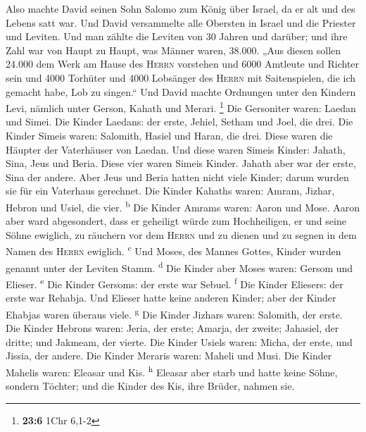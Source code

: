  Also machte David seinen Sohn Salomo zum König über
Israel, da er alt und des Lebens satt war.  Und David
versammelte alle Obersten in Israel und die Priester und Leviten.
 Und man zählte die Leviten von 30 Jahren und darüber; und
ihre Zahl war von Haupt zu Haupt, was Männer waren, 38.000.
 „Aus diesen sollen 24.000 dem Werk am Hause des
\textsc{Herrn} vorstehen und 6000 Amtleute und Richter sein
 und 4000 Torhüter und 4000 Lobsänger des \textsc{Herrn}
mit Saitenspielen, die ich gemacht habe, Lob zu singen.`` 
Und David machte Ordnungen unter den Kindern Levi, nämlich unter Gerson,
Kahath und Merari. \footnote{\textbf{23:6} 1Chr 6,1-2} 
Die Gersoniter waren: Laedan und Simei.  Die Kinder
Laedans: der erste, Jehiel, Setham und Joel, die drei. 
Die Kinder Simeis waren: Salomith, Hasiel und Haran, die drei. Diese
waren die Häupter der Vaterhäuser von Laedan.  Und diese
waren Simeis Kinder: Jahath, Sina, Jeus und Beria. Diese vier waren
Simeis Kinder.  Jahath aber war der erste, Sina der
andere. Aber Jeus und Beria hatten nicht viele Kinder; darum wurden sie
für ein Vaterhaus gerechnet.  Die Kinder Kahaths waren:
Amram, Jizhar, Hebron und Usiel, die vier. \textsuperscript{b}
 Die Kinder Amrams waren: Aaron und Mose. Aaron aber ward
abgesondert, dass er geheiligt würde zum Hochheiligen, er und seine
Söhne ewiglich, zu räuchern vor dem \textsc{Herrn} und zu dienen und zu
segnen in dem Namen des \textsc{Herrn} ewiglich. \textsuperscript{c}
 Und Moses, des Mannes Gottes, Kinder wurden genannt
unter der Leviten Stamm. \textsuperscript{d}  Die Kinder
aber Moses waren: Gersom und Elieser. \textsuperscript{e}
 Die Kinder Gersoms: der erste war Sebuel.
\textsuperscript{f}  Die Kinder Eliesers: der erste war
Rehabja. Und Elieser hatte keine anderen Kinder; aber der Kinder Ehabjas
waren überaus viele. \textsuperscript{g}  Die Kinder
Jizhars waren: Salomith, der erste.  Die Kinder Hebrons
waren: Jeria, der erste; Amarja, der zweite; Jahasiel, der dritte; und
Jakmeam, der vierte.  Die Kinder Usiels waren: Micha, der
erste, und Jissia, der andere.  Die Kinder Meraris waren:
Maheli und Musi. Die Kinder Mahelis waren: Eleasar und Kis.
\textsuperscript{h}  Eleasar aber starb und hatte keine
Söhne, sondern Töchter; und die Kinder des Kis, ihre Brüder, nahmen sie.
